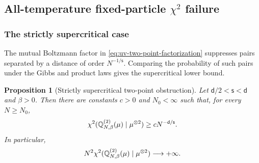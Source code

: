 \documentclass[11pt,reqno]{amsart}
\numberwithin{equation}{section}
\theoremstyle{plain}
\newtheorem{prop}[prop]{Proposition}
\theoremstyle{remark}
\DeclarePairedDelimiter{\pa}{\lparen}{\rparen}
\renewcommand{\d}{\mathsf{d}}
\newcommand{\Q}{{\mathbb{Q}}}
\newcommand{\be}{\beta}
\newcommand{\s}{\mathsf{s}}
\newcommand{\Chi}{\chi^2}
\begin{document}
\subsection{All-temperature fixed-particle \texorpdfstring{\(\chi^2\)}{chi-square} failure}
\label{subsec:uv-fixed-particle-chi2}

\subsubsection{The strictly supercritical case}
\label{subsubsec:uv-supercritical-two-point}

The mutual Boltzmann factor in \eqref{eq:uv-two-point-factorization} suppresses pairs separated by a distance of order \(N^{-1/\s}\).  Comparing the probability of such pairs under the Gibbs and product laws gives the supercritical lower bound.

\begin{prop}[Strictly supercritical two-point obstruction]
\label{prop:uv-two-point-supercritical}
Let \(\d/2<\s<\d\) and \(\be>0\).  Then there are constants \(c>0\) and \(N_0<\infty\) such that, for every \(N\ge N_0\),
\begin{align}\label{eq:uv-two-point-supercritical}
 \Chi\pa{\Q_{N,\be}^{(2)}(\mu)\mid\mu^{\otimes2}}
 \ge cN^{-\d/\s}.
\end{align}
In particular,
\begin{align}\label{eq:uv-two-point-supercritical-divergence}
 N^2\Chi\pa{\Q_{N,\be}^{(2)}(\mu)\mid\mu^{\otimes2}}
 \longrightarrow+\infty.
\end{align}
\end{prop}
\end{document}
